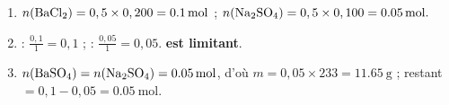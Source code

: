 \documentclass[11pt,a4paper]{article}
\begin{document}
\begin{corrige}
\begin{enumerate}[label=\alph*)]
  \item $n(\ce{BaCl2})=0,5\times0,200=\qty{0.1}{\mole}$ ; $n(\ce{Na2SO4})=0,5\times0,100=\qty{0.05}{\mole}.$
  \item {} : $\frac{0,1}{1}=0,1$ ;  : $\frac{0,05}{1}=0,05$.
        \textbf{ est limitant}.
  \item $n(\ce{BaSO4})=n(\ce{Na2SO4})=\qty{0.05}{\mole}$, d'où $m=0,05\times233=\qty{11.65}{\gram}$ ;
         restant $=0,1-0,05=\qty{0.05}{\mole}.$
\end{enumerate}
\end{corrige}
\end{document}
